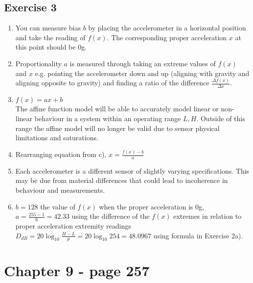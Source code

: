 \documentclass[11pt]{article}
\begin{document}
\subsection*{Exercise 3}
\begin{enumerate}[label=\alph*)]
    \item %
    You can measure bias $b$ by placing the accelerometer in a horizontal position and take the reading of $f(x)$. The corresponding proper acceleration $x$ at this point should be 0g. 
    \item %
    Proportionality $a$ is measured through taking an extreme values of $f(x)$ and $x$ e.g. pointing the accelerometer down and up (aligning with gravity and aligning opposite to gravity) and finding a ratio of the difference $\frac{\Delta f(x)}{\Delta x}$.
    \item %
    $f(x) = ax + b$\\
    The affine function model will be able to accurately model linear or non-linear behaviour in a system within an operating range $L,H$. Outside of this range the affine model will no longer be valid due to sensor physical limitations and saturations.
    \item %
    Rearranging equation from c), 
    $x = \frac{f(x) - b}{a}$
    \item %
    Each accelerometer is a different sensor of slightly varying specifications. This may be due from material differences that could lead to incoherence in behaviour and measurements.
    \item %
    $b = 128$ the value of $f(x)$ when the proper acceleration is 0g, $a = \frac{255-1}{6} = 42.33$ using the difference of the $f(x)$ extremes in relation to proper acceleration extremity readings\\
    $D_{dB} = 20\log_{10}\frac{H-L}{p} = 20\log_{10}254 = 48.0967$ using formula in Exercise 2a).
\end{enumerate}

\newpage
\section*{Chapter 9 - page 257}
\end{document}
